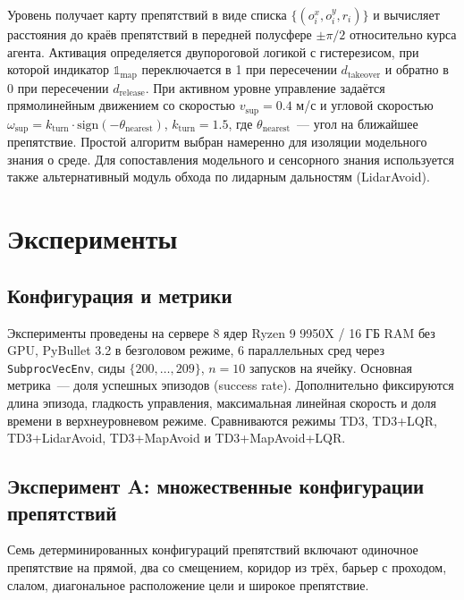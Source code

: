 \documentclass[11pt]{article}
\begin{document}
Уровень получает карту препятствий в виде списка $\{(o^x_i, o^y_i, r_i)\}$ и вычисляет расстояния до краёв препятствий в передней полусфере $\pm \pi/2$ относительно курса агента. Активация определяется двупороговой логикой с гистерезисом, при которой индикатор $\mathbb{1}_{\text{map}}$ переключается в 1 при пересечении $d_{\text{takeover}}$ и обратно в 0 при пересечении $d_{\text{release}}$. При активном уровне управление задаётся прямолинейным движением со скоростью $v_{\mathrm{sup}} = 0.4$ м/с и угловой скоростью $\omega_{\mathrm{sup}} = k_{\mathrm{turn}} \cdot \mathrm{sign}(-\theta_{\mathrm{nearest}})$, $k_{\mathrm{turn}} = 1.5$, где $\theta_{\mathrm{nearest}}$~--- угол на ближайшее препятствие. Простой алгоритм выбран намеренно для изоляции модельного знания о среде. Для сопоставления модельного и сенсорного знания используется также альтернативный модуль обхода по лидарным дальностям (LidarAvoid).


\section{Эксперименты}
\label{sec:experiments}

\subsection{Конфигурация и метрики}
\label{sec:exp_setup}

Эксперименты проведены на сервере 8 ядер Ryzen 9 9950X / 16 ГБ RAM без GPU, PyBullet 3.2 в безголовом режиме, 6 параллельных сред через \verb|SubprocVecEnv|, сиды $\{200, \ldots, 209\}$, $n = 10$ запусков на ячейку. Основная метрика~--- доля успешных эпизодов (success rate). Дополнительно фиксируются длина эпизода, гладкость управления, максимальная линейная скорость и доля времени в верхнеуровневом режиме. Сравниваются режимы TD3, TD3+LQR, TD3+LidarAvoid, TD3+MapAvoid и TD3+MapAvoid+LQR.


\subsection{Эксперимент A: множественные конфигурации препятствий}
\label{sec:exp_a}

Семь детерминированных конфигураций препятствий включают одиночное препятствие на прямой, два со смещением, коридор из трёх, барьер с проходом, слалом, диагональное расположение цели и широкое препятствие.
\end{document}
